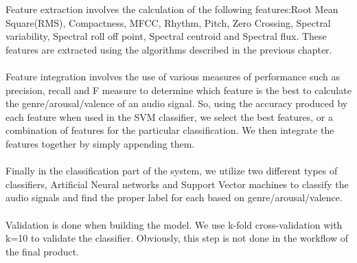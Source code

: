 Feature extraction involves the calculation of the following features:Root Mean Square(RMS), Compactness, MFCC, Rhythm, Pitch, Zero Crossing, Spectral variability, Spectral roll off point, Spectral centroid and Spectral flux. 
These features are extracted using the algorithms described in the previous chapter.\\
\\
Feature integration involves the use of various measures of performance such as precision, recall and F measure to determine which feature is the best to calculate the genre/arousal/valence of an audio signal.  
So, using the accuracy produced by each feature when used in the SVM classifier, we select the best features, or a combination of features for the particular classification.
We then integrate the features together by simply appending them.\\
\\
Finally in the classification part of the system, we utilize two different types of classifiers, Artificial Neural networks and Support Vector machines to classify the audio signals and find the proper label for each based on genre/arousal/valence.\\
\\
Validation is done when building the model. We use k-fold cross-validation with k=10 to validate the classifier.
Obviously, this step is not done in the workflow of the final product.\\

